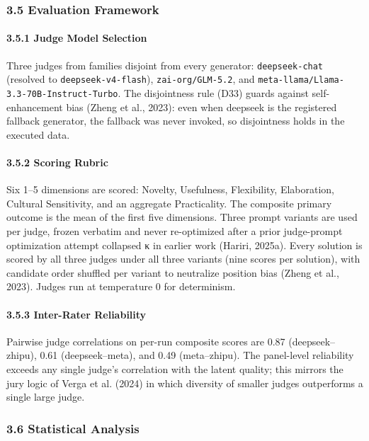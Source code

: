 \documentclass[11pt,a4paper]{article}
\begin{document}
\subsubsection{3.5 Evaluation Framework}

\paragraph{3.5.1 Judge Model Selection}

Three judges from families disjoint from every generator:
\texttt{deepseek-chat} (resolved to \texttt{deepseek-v4-flash}), \texttt{zai-org/GLM-5.2},
and \texttt{meta-llama/Llama-3.3-70B-Instruct-Turbo}. The disjointness rule
(D33) guards against self-enhancement bias (Zheng et al., 2023): even
when deepseek is the registered fallback generator, the fallback was
never invoked, so disjointness holds in the executed data.

\paragraph{3.5.2 Scoring Rubric}

Six 1–5 dimensions are scored: \textit{}Novelty, Usefulness, Flexibility,
Elaboration, Cultural Sensitivity, and an aggregate Practicality\textit{}.
The composite primary outcome is the mean of the first five
dimensions. Three prompt variants are used per judge, frozen verbatim
and never re-optimized after a prior judge-prompt optimization attempt
collapsed κ in earlier work (Hariri, 2025a). Every solution is
scored by all three judges under all three variants (nine scores per
solution), with candidate order shuffled per variant to neutralize
position bias (Zheng et al., 2023). Judges run at temperature 0 for
determinism.

\paragraph{3.5.3 Inter-Rater Reliability}

Pairwise judge correlations on per-run composite scores are 0.87
(deepseek–zhipu), 0.61 (deepseek–meta), and 0.49 (meta–zhipu). The
panel-level reliability exceeds any single judge's correlation with
the latent quality; this mirrors the jury logic of Verga et al.
(2024) in which diversity of smaller judges outperforms a single
large judge.

\subsubsection{3.6 Statistical Analysis}
\end{document}
